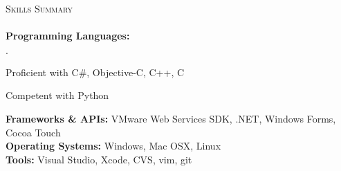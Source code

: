 \documentclass[11pt]{article}
\newcommand{\mydot}{$\cdot$ }
\newcommand{\lineunder}{\vspace*{-8pt} \\ \hspace*{-18pt} \hrulefill \\}
\newcommand{\header}[1]{{\hspace*{-15pt}\vspace*{6pt} \textsc{#1}} \vspace*{-6pt} \lineunder}
\newenvironment{achievements}{\begin{list}{\mydot}{\topsep 0pt \itemsep -2pt}}{\vspace*{4pt}\end{list}}
\begin{document}

\header{Skills Summary}
\textbf{Programming Languages:} 
\begin{achievements}
  \item Proficient with C\#, Objective-C, C++, C
  \item Competent with Python
\end{achievements}
\vspace{-3pt}

\textbf{Frameworks \& APIs:} VMware Web Services SDK, .NET, Windows Forms, Cocoa Touch\\

\textbf{Operating Systems:} Windows, Mac OSX, Linux\\

\textbf{Tools:} Visual Studio, Xcode, CVS, vim, git\\
\end{document}
